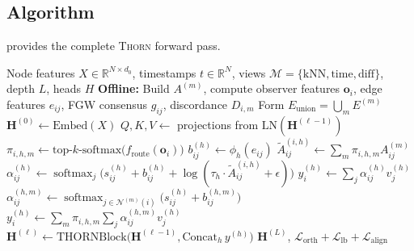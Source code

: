 \documentclass[11pt,a4paper]{article}
\newcommand{\thorn}{\textsc{Thorn}}
\newcommand{\RR}{\mathbb{R}}
\newcommand{\calM}{\mathcal{M}}
\newcommand{\calN}{\mathcal{N}}
\newcommand{\calL}{\mathcal{L}}
\DeclareMathOperator{\softmax}{softmax}
\begin{document}
\subsection{Algorithm}
\label{sec:algorithm}

 provides the complete \thorn{} forward pass.

\begin{algorithm}[t]
\caption{\thorn{}: Forward Pass}
\label{alg:thorn}
\begin{algorithmic}[1]
\Require Node features $X \in \RR^{N \times d_0}$, timestamps
  $t \in \RR^{N}$, views $\calM = \{\text{kNN}, \text{time},
  \text{diff}\}$, depth $L$, heads $H$
\Statex
\State \textbf{Offline:} Build $A^{(m)}$, compute observer features
  $\mathbf{o}_i$, edge features $e_{ij}$, FGW consensus $g_{ij}$,
  discordance $D_{i,m}$
\State Form $E_{\mathrm{union}} = \bigcup_m E^{(m)}$
\Statex
\State $\mathbf{H}^{(0)} \gets \mathrm{Embed}(X)$
  \State $Q, K, V \gets$ projections from
    $\mathrm{LN}(\mathbf{H}^{(\ell-1)})$
  \State $\pi_{i,h,m} \gets \text{top-}k\text{-softmax}\big(
    f_{\text{route}}(\mathbf{o}_i)\big)$
  \State $b_{ij}^{(h)} \gets \phi_h(e_{ij})$
    \State $\tilde{A}_{ij}^{(i,h)} \gets \sum_m \pi_{i,h,m}
      A_{ij}^{(m)}$
    \State $\alpha_{ij}^{(h)} \gets \softmax_j\!\big(
      s_{ij}^{(h)} + b_{ij}^{(h)} +
      \log(\tau_h \cdot \tilde{A}_{ij}^{(i,h)} + \epsilon)\big)$
    \State $y_i^{(h)} \gets \sum_j \alpha_{ij}^{(h)} v_j^{(h)}$
  \Else
      \State $\alpha_{ij}^{(h,m)} \gets \softmax_{j \in
        \calN^{(m)}(i)}\!\big(s_{ij}^{(h)} + b_{ij}^{(h,m)}\big)$
    \EndFor
    \State $y_i^{(h)} \gets \sum_m \pi_{i,h,m} \sum_j
      \alpha_{ij}^{(h,m)} v_j^{(h)}$
  \EndIf
  \State $\mathbf{H}^{(\ell)} \gets \mathrm{THORNBlock}\!\big(
    \mathbf{H}^{(\ell-1)}, \mathrm{Concat}_h\, y^{(h)}\big)$
\EndFor
\State \Return $\mathbf{H}^{(L)}$, $\calL_{\mathrm{orth}} +
  \calL_{\mathrm{lb}} + \calL_{\mathrm{align}}$
\end{algorithmic}
\end{algorithm}

\end{document}
